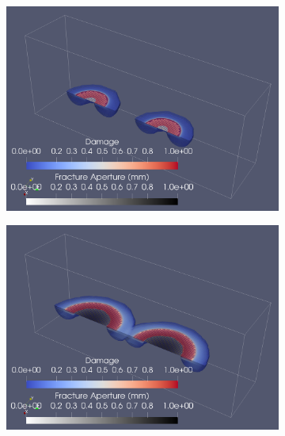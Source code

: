 \begin{figure}[h]
\begin{subfigure}{.45\textwidth}
  \centering
  \includegraphics[width=\linewidth]{Chapter4/figures/merging/merging_t_1.png}
  \caption{}
  \label{fig:merge_t_0}
\end{subfigure}%
\hspace{1cm}
\begin{subfigure}{.45\textwidth}
  \centering
  \includegraphics[width=\linewidth]{Chapter4/figures/merging/merging_t_14.png}
  \caption{}
  \label{fig:merge_t_1}
\end{subfigure}%


\end{figure}
